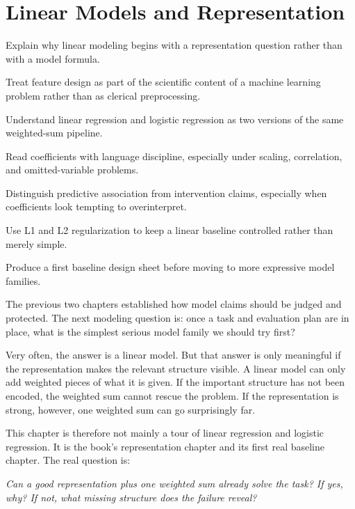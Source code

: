 \chapter{Linear Models and Representation}

\begin{learninggoals}
\item Explain why linear modeling begins with a representation question rather than with a model formula.
\item Treat feature design as part of the scientific content of a machine learning problem rather than as clerical preprocessing.
\item Understand linear regression and logistic regression as two versions of the same weighted-sum pipeline.
\item Read coefficients with language discipline, especially under scaling, correlation, and omitted-variable problems.
\item Distinguish predictive association from intervention claims, especially when coefficients look tempting to overinterpret.
\item Use L1 and L2 regularization to keep a linear baseline controlled rather than merely simple.
\item Produce a first baseline design sheet before moving to more expressive model families.
\end{learninggoals}

The previous two chapters established how model claims should be judged and protected. The next modeling question is: once a task and evaluation plan are in place, what is the simplest serious model family we should try first?

Very often, the answer is a linear model. But that answer is only meaningful if the representation makes the relevant structure visible. A linear model can only add weighted pieces of what it is given. If the important structure has not been encoded, the weighted sum cannot rescue the problem. If the representation is strong, however, one weighted sum can go surprisingly far.

This chapter is therefore not mainly a tour of linear regression and logistic regression. It is the book's representation chapter and its first real baseline chapter. The real question is:

\begin{center}
\emph{Can a good representation plus one weighted sum already solve the task? If yes, why? If not, what missing structure does the failure reveal?}
\end{center}

